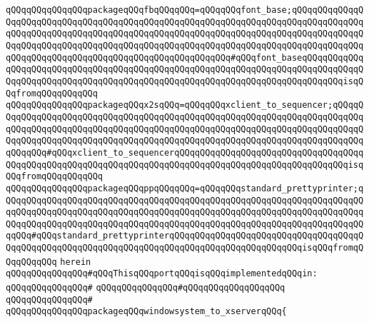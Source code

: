 \verb|qQQqqQQqqQQqqQQqpackageqQQqfbqQQqqQQq=qQQqqQQqfont_base;qQQqqQQqqQQqqQQqqQQqqQQqqQQqqQQqqQQqqQQqqQQqqQQqqQQqqQQqqQQqqQQqqQQqqQQqqQQqqQQqqQQqqQQqqQQqqQQqqQQqqQQqqQQqqQQqqQQqqQQqqQQqqQQqqQQqqQQqqQQqqQQqqQQqqQQqqQQqqQQqqQQqqQQqqQQqqQQqqQQqqQQqqQQqqQQqqQQqqQQqqQQqqQQqqQQqqQQqqQQqqQQqqQQqqQQqqQQqqQQqqQQqqQQqqQQqqQQqqQQqqQQqqQQq#qQQqfont_baseqQQqqQQqqQQqqQQqqQQqqQQqqQQqqQQqqQQqqQQqqQQqqQQqqQQqqQQqqQQqqQQqqQQqqQQqqQQqqQQqqQQqqQQqqQQqqQQqqQQqqQQqqQQqqQQqqQQqqQQqqQQqqQQqqQQqqQQqqQQqqQQqqQQqisqQQqfromqQQqqQQqqQQq|\newline
\verb|qQQqqQQqqQQqqQQqpackageqQQqx2sqQQq=qQQqqQQqxclient_to_sequencer;qQQqqQQqqQQqqQQqqQQqqQQqqQQqqQQqqQQqqQQqqQQqqQQqqQQqqQQqqQQqqQQqqQQqqQQqqQQqqQQqqQQqqQQqqQQqqQQqqQQqqQQqqQQqqQQqqQQqqQQqqQQqqQQqqQQqqQQqqQQqqQQqqQQqqQQqqQQqqQQqqQQqqQQqqQQqqQQqqQQqqQQqqQQqqQQqqQQqqQQqqQQqqQQqqQQqqQQqqQQqqQQq#qQQqxclient_to_sequencerqQQqqQQqqQQqqQQqqQQqqQQqqQQqqQQqqQQqqQQqqQQqqQQqqQQqqQQqqQQqqQQqqQQqqQQqqQQqqQQqqQQqqQQqqQQqqQQqqQQqqQQqisqQQqfromqQQqqQQqqQQq|\newline
\verb|qQQqqQQqqQQqqQQqpackageqQQqppqQQqqQQq=qQQqqQQqstandard_prettyprinter;qQQqqQQqqQQqqQQqqQQqqQQqqQQqqQQqqQQqqQQqqQQqqQQqqQQqqQQqqQQqqQQqqQQqqQQqqQQqqQQqqQQqqQQqqQQqqQQqqQQqqQQqqQQqqQQqqQQqqQQqqQQqqQQqqQQqqQQqqQQqqQQqqQQqqQQqqQQqqQQqqQQqqQQqqQQqqQQqqQQqqQQqqQQqqQQqqQQqqQQqqQQqqQQqqQQqqQQq#qQQqstandard_prettyprinterqQQqqQQqqQQqqQQqqQQqqQQqqQQqqQQqqQQqqQQqqQQqqQQqqQQqqQQqqQQqqQQqqQQqqQQqqQQqqQQqqQQqqQQqqQQqqQQqisqQQqfromqQQqqQQqqQQq|\newline
\verb|herein|\newline
\newline
\newline
\verb|qQQqqQQqqQQqqQQq#qQQqThisqQQqportqQQqisqQQqimplementedqQQqin:|\newline
\verb|qQQqqQQqqQQqqQQq#|\newline
\verb|qQQqqQQqqQQqqQQq#qQQqqQQqqQQqqQQqqQQq|\newline
\verb|qQQqqQQqqQQqqQQq#|\newline
\verb|qQQqqQQqqQQqqQQqpackageqQQqwindowsystem_to_xserverqQQq{|\newline
